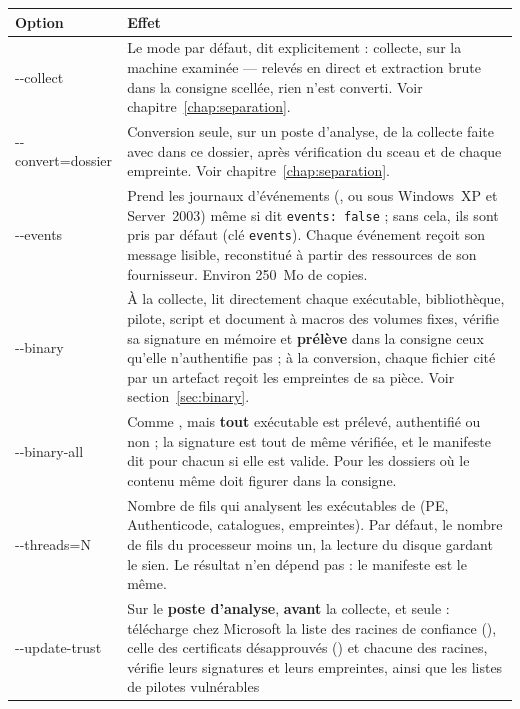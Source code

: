 \documentclass[11pt,a4paper,oneside]{report}
\begin{document}
\begin{longtable}{@{}>{\ttfamily}L{3.2cm}L{11.2cm}@{}}
\toprule
\normalfont\bfseries Option & \bfseries Effet \\
\midrule
\endhead
-{}-collect & Le mode par défaut, dit explicitement : collecte, sur la machine
  examinée — relevés en direct et extraction brute dans la consigne scellée,
  rien n'est converti. Voir chapitre~\ref{chap:separation}. \\
-{}-convert=\newline dossier & Conversion seule, sur un poste d'analyse, de la collecte
  faite avec  dans ce dossier, après vérification du sceau et de
  chaque empreinte. Voir chapitre~\ref{chap:separation}. \\
-{}-events & Prend les journaux d'événements (, ou
   sous Windows~XP et Server~2003) même si
   dit \texttt{events: false} ; sans cela, ils sont pris par
  défaut (clé \texttt{events}). Chaque événement reçoit son message lisible,
  reconstitué à partir des ressources de son fournisseur. Environ 250~Mo de
  copies. \\
-{}-binary & À la collecte, lit directement chaque exécutable, bibliothèque,
  pilote, script et document à macros des volumes fixes, vérifie sa signature en
  mémoire et \textbf{prélève} dans la consigne ceux qu'elle n'authentifie pas ;
  à la conversion, chaque fichier cité par un artefact reçoit les empreintes de
  sa pièce. Voir section~\ref{sec:binary}. \\
-{}-binary-all & Comme , mais \textbf{tout} exécutable est prélevé,
  authentifié ou non ; la signature est tout de même vérifiée, et le manifeste
  dit pour chacun si elle est valide. Pour les dossiers où le contenu même doit
  figurer dans la consigne. \\
-{}-threads=N & Nombre de fils qui analysent les exécutables de 
   (PE, Authenticode, catalogues, empreintes). Par défaut, le nombre
  de fils du processeur moins un, la lecture du disque gardant le sien. Le
  résultat n'en dépend pas : le manifeste est le même. \\
-{}-update-trust\newline [=dossier] & Sur le \textbf{poste d'analyse}, \textbf{avant} la collecte, et
  seule : télécharge chez Microsoft la liste des racines de confiance
  (), celle des certificats désapprouvés
  () et chacune des racines, vérifie leurs
  signatures et leurs empreintes, ainsi que les listes de pilotes vulnérables

\end{longtable}
\end{document}
